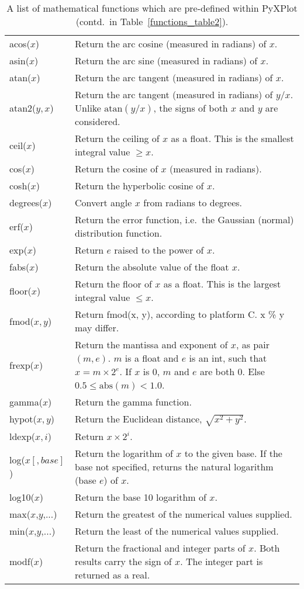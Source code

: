 \begin{table}
\begin{longtable}{|lp{8cm}|}
\hline
acos($x$)&
Return the arc cosine (measured in radians) of $x$.\\
asin($x$)&
Return the arc sine (measured in radians) of $x$.\\
atan($x$)&
Return the arc tangent (measured in radians) of $x$.\\
atan2($y,x$)&
Return the arc tangent (measured in radians) of $y/x$. Unlike $\mathrm{atan}(y/x)$, the signs of both $x$ and $y$ are considered.\\
ceil($x$)&
Return the ceiling of $x$ as a float. This is the smallest integral value $\geq x$.\\
cos($x$)&
Return the cosine of $x$ (measured in radians).\\
cosh($x$)&
Return the hyperbolic cosine of $x$.\\
degrees($x$)&
Convert angle $x$ from radians to degrees.\\
erf($x$)&
Return the error function, i.e.\ the Gaussian (normal) distribution function.\\
exp($x$)&
Return $e$ raised to the power of $x$.\\
fabs($x$)&
Return the absolute value of the float $x$.\\
floor($x$)&
Return the floor of $x$ as a float. This is the largest integral value $\leq x$.\\
fmod($x,y$)&
Return fmod(x, y), according to platform C.  x \% y may differ.\\
frexp($x$)&
Return the mantissa and exponent of $x$, as pair $(m,e)$. $m$ is a float and $e$ is an int, such that $x = m \times 2^e$. If $x$ is 0, $m$ and $e$ are both 0.  Else $0.5 \leq \mathrm{abs}(m) < 1.0$.\\
gamma($x$)&
Return the gamma function.\\
hypot($x,y$)&
Return the Euclidean distance, $\sqrt{x^2 + y^2}$.\\
ldexp($x, i$)&
Return $x \times 2^i$. \\
log($x[,base]$)&
Return the logarithm of $x$ to the given base. If the base not specified, returns the natural logarithm (base $e$) of $x$.\\
log10($x$)&
Return the base 10 logarithm of $x$.\\
max($x$,$y$,...)&
Return the greatest of the numerical values supplied.\\
min($x$,$y$,...)&
Return the least of the numerical values supplied.\\
modf($x$)&
Return the fractional and integer parts of $x$.  Both results carry the sign of $x$.  The integer part is returned as a real.\\
\hline
\end{longtable}
\caption{A list of mathematical functions which are pre-defined within PyXPlot (contd.\ in Table~\ref{functions_table2}).}
\label{functions_table}
\end{table}

